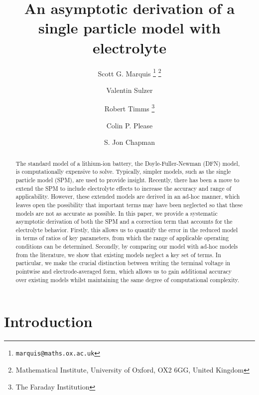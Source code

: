 \documentclass[a4paper]{article}
\begin{document}
\title{An asymptotic derivation of a single particle model with electrolyte}

\author{
    Scott G. Marquis 
        \footnote{\texttt{marquis@maths.ox.ac.uk}}
        \footnote{Mathematical Institute, University of Oxford, OX2 6GG, United Kingdom}
        \and
    Valentin Sulzer \footnotemark[2] \and
    Robert Timms \footnotemark[2] \footnote{The Faraday Institution} \and
    Colin P. Please \footnotemark[2] \footnotemark[3] \and
    S. Jon Chapman  \footnotemark[2] \footnotemark[3]
}

\maketitle

\begin{abstract}
    The standard model of a lithium-ion battery, the Doyle-Fuller-Newman (DFN) model, is computationally expensive to solve. Typically, simpler models, such as the single particle model (SPM), are used to provide insight. Recently, there has been a move to extend the SPM to include electrolyte effects to increase the accuracy and range of applicability. However, these extended models are derived in an ad-hoc manner, which leaves open the possibility that important terms may have been neglected so that these models are not as accurate as possible. In this paper, we provide a systematic asymptotic derivation of both the SPM and a correction term that accounts for the electrolyte behavior. Firstly, this allows us to quantify the error in the reduced model in terms of ratios of key parameters, from which the range of applicable operating conditions can be determined. Secondly, by comparing our model with ad-hoc models from the literature, we show that existing models neglect a key set of terms. In particular, we make the crucial distinction between writing the terminal voltage in pointwise and electrode-averaged form, which allows us to gain additional accuracy over existing models whilst maintaining the same degree of computational complexity.
\end{abstract}

\section{Introduction} 
\end{document}
